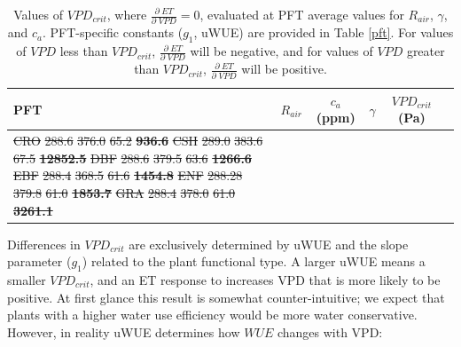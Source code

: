 \documentclass[draft,linenumbers]{agujournal}
\providecommand{\DIFdel}[1]{{\protect\color{red}\sout{#1}}}                      %
\providecommand{\DIFdelFL}[1]{\DIFdel{#1}} %
\providecommand{\DIFaddbeginFL}{} %
\providecommand{\DIFaddendFL}{} %
\providecommand{\DIFdelbeginFL}{} %
\providecommand{\DIFdelendFL}{} %
\begin{document}
\begin{table}
  \caption{Values of $VPD_{crit}$, where
    $\frac{\partial \; ET}{\partial \; VPD} = 0$, evaluated at PFT
    average values for $R_{air}$, $\gamma$, and $c_a$. PFT-specific
    constants ($g_1$, uWUE) are provided in Table \ref{pft}. For
    values of $VPD$ less than $VPD_{crit}$,
    $\frac{\partial \; ET}{\partial \; VPD}$ will be negative, and for
    values of $VPD$ greater than $VPD_{crit}$,
    $\frac{\partial \; ET}{\partial \; VPD}$ will be positive.}
  \centering
  \begin{tabular}{l c c c c c}
    \hline
    PFT & $R_{air}$ & $c_a$ (ppm) & $\gamma$  & \textbf{$VPD_{crit}$ (Pa)} \\
    \hline
    \DIFdelbeginFL \DIFdelFL{CRO }%
\DIFdelFL{288.6 }%
\DIFdelFL{376.0 }%
\DIFdelFL{65.2 }%
\textbf{\DIFdelFL{936.6}} %
\DIFdelFL{CSH }%
\DIFdelFL{289.0 }%
\DIFdelFL{383.6 }%
\DIFdelFL{67.5 }%
\textbf{\DIFdelFL{12852.5}}
\DIFdelFL{DBF }%
\DIFdelFL{288.6 }%
\DIFdelFL{379.5 }%
\DIFdelFL{63.6 }%
\textbf{\DIFdelFL{1266.6}} %
\DIFdelFL{EBF }%
\DIFdelFL{288.4 }%
\DIFdelFL{368.5
}%
\DIFdelFL{61.6 }%
\textbf{\DIFdelFL{1454.8}} %
\DIFdelFL{ENF }%
\DIFdelFL{288.28 }%
\DIFdelFL{379.8 }%
\DIFdelFL{61.0 }%
\textbf{\DIFdelFL{1853.7}} %
\DIFdelFL{GRA }%
\DIFdelFL{288.4 }%
\DIFdelFL{378.0 }%
\DIFdelFL{61.0 }%
\textbf{\DIFdelFL{3261.1}} %
\DIFdelendFL \DIFaddbeginFL 
    \DIFaddendFL \hline
  \end{tabular}
  \label{vpd_crit}
\end{table}


Differences in $VPD_{crit}$ are exclusively determined by uWUE and the
slope parameter ($g_1$) related to the plant functional type. A larger
uWUE means a smaller $VPD_{crit}$, and an ET response to increases VPD
that is more likely to be positive. At first glance this result is
somewhat counter-intuitive; we expect that plants with a higher water
use efficiency would be more water conservative. However, in reality
uWUE determines how $WUE$ changes with VPD:
\end{document}
